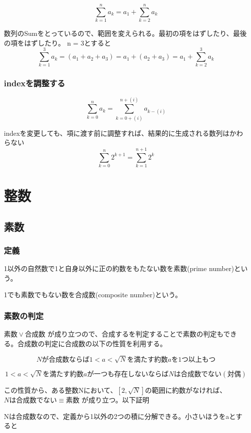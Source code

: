 \documentclass[dvipdfmx]{jsarticle}
\begin{document}
\[ \sum_{k=1}^{n}a_k = a_1 + \sum_{k=2}^{n}a_k \]

数列のSumをとっているので、範囲を変えられる。最初の項をはずしたり、最後の項をはずしたり。 n = 3とすると
\[ \sum_{k=1}^{3}a_k = (a_1 + a_2 + a_3) = a_1 + (a_2 + a_3) = a_1 + \sum_{k=2}^{3}a_k \]

\subsubsection{indexを調整する}

\[ \sum_{k=0}^{n}a_k = \sum_{k=0+(i)}^{n+(i)}a_{k-(i)} \]

indexを変更しても、項に渡す前に調整すれば、結果的に生成される数列はかわらない
\[ \sum_{k=0}^{n}2^{k+1} = \sum_{k=1}^{n+1}2^k \]

\section{整数}

\subsection{素数}

\subsubsection{定義}

1以外の自然数で1と自身以外に正の約数をもたない数を素数(prime number)という。

1でも素数でもない数を合成数(composite number)という。

\subsubsection{素数の判定}

$素数 \lor 合成数$ が成り立つので、合成するを判定することで素数の判定もできる。合成数の判定に合成数の以下の性質を利用する。

\[Nが合成数 ならば 1 < a < \sqrt{N} を満たす約数aを1つ以上もつ\]

\[1 < a < \sqrt{N}を満たす約数aが一つも存在しない ならば　Nは合成数でない(対偶) \]

この性質から、ある整数Nにおいて、$[2, \sqrt{N}]$の範囲に約数がなければ、$Nは合成数でない \equiv 素数$ が成り立つ。以下証明

Nは合成数なので、定義から1以外の2つの積に分解できる。小さいほうをaとすると
\end{document}
